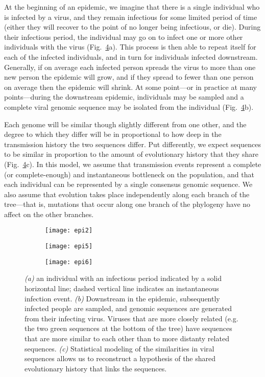 At the beginning of an epidemic, we imagine that there is a single individual who is infected by a virus, and they remain infectious for some limited period of time (either they will recover to the point of no longer being infectious, or die).
During their infectious period, the individual may go on to infect one or more other individuals with the virus (Fig.~\ref{fig:epiProcess}a).
This process is then able to repeat itself for each of the infected individuals, and in turn for individuals infected downstream.
Generally, if on average each infected person spreads the virus to more than one new person the epidemic will grow, and if they spread to fewer than one person on average then the epidemic will shrink.
At some point---or in practice at many points---during the downstream epidemic, individuals may be sampled and a complete viral genomic sequence may be isolated from the individual (Fig.~\ref{fig:epiProcess}b).

Each genome will be similar though slightly different from one other, and the degree to which they differ will be in proportional to how deep in the transmission history the two sequences differ.
Put differently, we expect sequences to be similar in proportion to the amount of evolutionary history that they share (Fig.~\ref{fig:epiProcess}c).
In this model, we assume that transmission events represent a complete (or complete-enough) and instantaneous bottleneck on the population, and that each individual can be represented by a single consensus genomic sequence.
We also assume that evolution takes place independently along each branch of the tree---that is, mutations that occur along one branch of the phylogeny have no affect on the other branches.

\begin{figure}[ht]
  \centering
  \begin{subfigure}{0.45\textwidth}
    \texttt{[image: epi2]}
    \label{fig:epiProcess1}
    \caption{}
  \end{subfigure}
  \begin{subfigure}{0.45\textwidth}
    \texttt{[image: epi5]}
    \label{fig:epiProcess2}
    \caption{}
  \end{subfigure}
  \begin{subfigure}{0.45\textwidth}
    \texttt{[image: epi6]}
    \label{fig:epiProcess3}
    \caption{}
  \end{subfigure}
  \caption[The epidemic process is inherently treelike]{\textit{(a)} an individual with an infectious period indicated by a solid horizontal line; dashed vertical line indicates an instantaneous infection event. \textit{(b)} Downstream in the epidemic, subsequently infected people are sampled, and genomic sequences are generated from their infecting virus. Viruses that are more closely related (e.g. the two green sequences at the bottom of the tree) have sequences that are more similar to each other than to more distanty related sequences. \textit{(c)} Statistical modeling of the similarities in viral sequences allows us to reconstruct a hypothesis of the shared evolutionary history that links the sequences.}
  \label{fig:epiProcess}
\end{figure}

